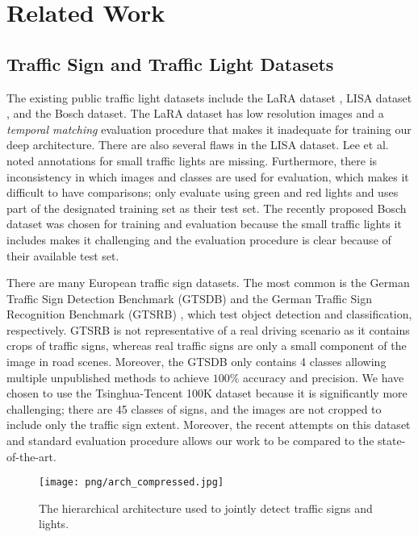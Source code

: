\documentclass[10pt, conference, compsocconf]{IEEEtran}
\begin{document}
\section{Related Work} \label{related_work}

\subsection{Traffic Sign and Traffic Light Datasets}
The existing public traffic light datasets include the LaRA dataset \cite{lara}, LISA dataset \cite{lisa1, lisa2}, and the Bosch dataset. The LaRA dataset has low resolution images and a \textit{temporal matching} evaluation procedure that makes it inadequate for training our deep architecture. There are also several flaws in the LISA dataset. Lee et al. \cite{lee} noted annotations for small traffic lights are missing. Furthermore, there is inconsistency in which images and classes are used for evaluation, which makes it difficult to have comparisons; \cite{lee,li2017a} only evaluate using green and red lights and \cite{lee} uses part of the designated training set as their test set. The recently proposed Bosch dataset was chosen for training and evaluation because the small traffic lights it includes makes it challenging and the evaluation procedure is clear because of their available test set.

There are many European traffic sign datasets. The most common is the German Traffic Sign Detection Benchmark (GTSDB) \cite{GTSDB} and the German Traffic Sign Recognition Benchmark (GTSRB) \cite{GTSRB}, which test object detection and classification, respectively. GTSRB is not representative of a real driving scenario as it contains crops of traffic signs, whereas real traffic signs are only a small component of the image in road scenes. Moreover, the GTSDB only contains 4 classes allowing multiple unpublished methods to achieve $100\%$ accuracy and precision.  We have chosen to use the Tsinghua-Tencent 100K dataset because it is significantly more challenging; there are 45 classes of signs, and the images are not cropped to include only the traffic sign extent. Moreover, the recent attempts \cite{tencent, perceptual_gan, meng} on this dataset and standard evaluation procedure allows our work to be compared to the state-of-the-art.

\begin{figure*}[t]
\begin{center}
\texttt{[image: png/arch\_compressed.jpg]}
\end{center}
\caption{The hierarchical architecture used to jointly detect traffic signs and lights.}
\label{arch}
\end{figure*}
\end{document}
